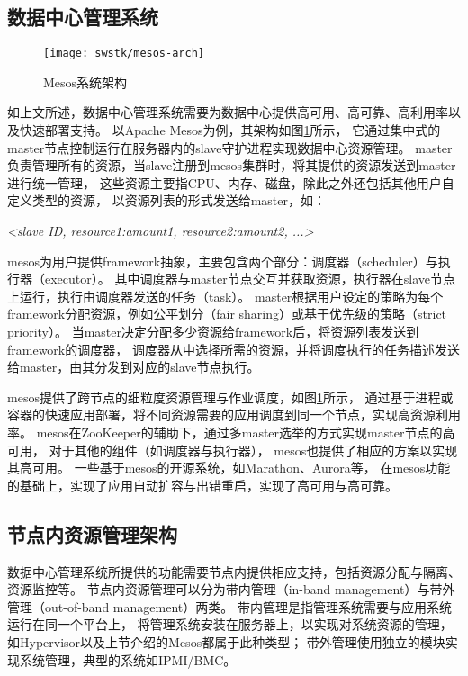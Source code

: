 \subsection{数据中心管理系统}

\begin{figure}[tb]
  \centering
  \texttt{[image: swstk/mesos-arch]}
  \caption{Mesos系统架构}
  \label{fig:mesos-arch}
\end{figure}

如上文所述，数据中心管理系统需要为数据中心提供高可用、高可靠、高利用率以及快速部署支持。
以Apache Mesos\cite{Hindman:2011:Mesos}为例，其架构如图\ref{fig:mesos-arch}所示，
它通过集中式的master节点控制运行在服务器内的slave守护进程实现数据中心资源管理。
master负责管理所有的资源，当slave注册到mesos集群时，将其提供的资源发送到master进行统一管理，
这些资源主要指CPU、内存、磁盘，除此之外还包括其他用户自定义类型的资源，
以资源列表的形式发送给master，如：

\textit{<slave ID, resource1:amount1, resource2:amount2, ...>}

mesos为用户提供framework抽象，主要包含两个部分：调度器（scheduler）与执行器（executor）。
其中调度器与master节点交互并获取资源，执行器在slave节点上运行，执行由调度器发送的任务（task）。
master根据用户设定的策略为每个framework分配资源，例如公平划分（fair sharing）或基于优先级的策略（strict priority）。
当master决定分配多少资源给framework后，将资源列表发送到framework的调度器，
调度器从中选择所需的资源，并将调度执行的任务描述发送给master，由其分发到对应的slave节点执行。

mesos提供了跨节点的细粒度资源管理与作业调度，如图\ref{fig:mesos-arch}所示，
通过基于进程或容器的快速应用部署，将不同资源需要的应用调度到同一个节点，实现高资源利用率。
mesos在ZooKeeper的辅助下，通过多master选举的方式实现master节点的高可用，
对于其他的组件（如调度器与执行器），
mesos也提供了相应的方案以实现其高可用\cite{mesos-high-available-framework}。
一些基于mesos的开源系统，如Marathon\cite{marathon}、Aurora\cite{Aurora}等，
在mesos功能的基础上，实现了应用自动扩容与出错重启，实现了高可用与高可靠。


\subsection{节点内资源管理架构}

数据中心管理系统所提供的功能需要节点内提供相应支持，包括资源分配与隔离、资源监控等。
节点内资源管理可以分为带内管理（in-band management）与带外管理（out-of-band management）两类。
带内管理是指管理系统需要与应用系统运行在同一个平台上，
将管理系统安装在服务器上，以实现对系统资源的管理，
如Hypervisor以及上节介绍的Mesos都属于此种类型；
带外管理使用独立的模块实现系统管理，典型的系统如IPMI/BMC。

